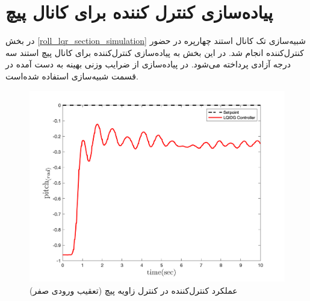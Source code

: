 \section{پیاده‌سازی کنترل کننده برای کانال پیچ}\label{roll_lqr_section}
در بخش
\ref{roll_lqr_section_simulation}
شبیه‌سازی تک کانال استند چهارپره در حضور کنترل‌کننده  انجام شد. در این بخش به پیاده‌سازی کنترل‌کننده  برای کانال پیچ استند سه درجه آزادی پرداخته می‌شود. در پیاده‌سازی از ضرایب وزنی بهینه به دست آمده در قسمت شبیه‌سازی استفاده شده‌است.
\begin{figure}[H]
	\includegraphics[width=.48\linewidth]{../Figures/Calibration/LQR/Pitch/lqr_pitch.png}
	\centering
	\caption{عملكرد کنترل‌کننده  در کنترل زاويه پیچ (تعقیب ورودی صفر)}
\end{figure}
%
